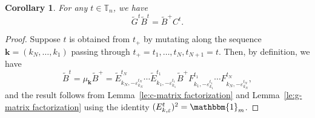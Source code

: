\documentclass{amsart}
\newtheorem{corollary}[theorem]{Corollary}
\numberwithin{theorem}{section}
\newcommand{\bfk}{{\boldsymbol{k}}}
\newcommand{\TT}{\mathbb{T}}
\newcommand{\bOne}{\mathbbm{1}}
\begin{document}
  \begin{corollary}
    \label{cor:GB=BC}
    For any $t\in\TT_n$, we have
    \[\widetilde G^t\widetilde B^t=\widetilde B^+ C^t.\]
  \end{corollary}
  \begin{proof}
    Suppose $t$ is obtained from $t_+$ by mutating along the sequence $\bfk=(k_N,\ldots,k_1)$ passing through $t_+=t_1,\ldots,t_N,t_{N+1}=t$.
    Then, by definition, we have
    \[ \widetilde B^t = \mu_\bfk \widetilde B^+ = \widetilde E^{t_N}_{k_N,-\varepsilon^{t_N}_{k_N}}\cdots \widetilde E^{t_1}_{k_1,-\varepsilon^{t_1}_{k_1}} \widetilde B^+ F^{t_1}_{k_1,-\varepsilon^{t_1}_{k_1}}\cdots F^{t_N}_{k_N,-\varepsilon^{t_N}_{k_N}}, \]
    and the result follows from Lemma~\ref{le:c-matrix factorization} and Lemma~\ref{le:g-matrix factorization} using the identity $(E^t_{k,\varepsilon})^2=\bOne_m$.
  \end{proof}
\end{document}
